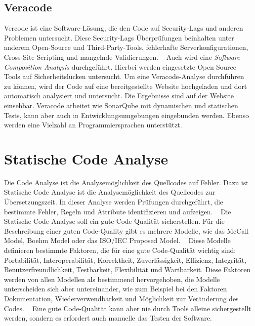 \subsection{Veracode}
Vercode ist eine Software-Lösung, die den Code auf Security-Lags und anderen Problemen untersucht. Diese Security-Lags Überprüfungen beinhalten unter anderem Open-Source und Third-Party-Tools, fehlerhafte Serverkonfigurationen, Cross-Site Scripting und mangelnde Validierungen. ~\parencite{veracodeSecurity}  Auch wird eine \textit{Software Composition Analysis} durchgeführt. Hierbei werden eingesetzte Open Source Tools auf Sicherheitslücken untersucht. Um eine Veracode-Analyse durchführen zu können, wird der Code auf eine bereitgestellte Website hochgeladen und dort automatisch analysiert und untersucht. Die Ergebnisse sind auf der Website einsehbar. Veracode arbeitet wie SonarQube mit dynamischen und statischen Tests, kann aber auch in Entwicklungsumgebungen eingebunden werden. Ebenso werden eine Vielzahl an Programmiersprachen unterstützt.  ~\parencite{veracodeDig}  

\section{Statische Code Analyse}
Die Code Analyse ist die Analysemöglichkeit des Quellcodes auf Fehler. Dazu ist Statische Code Analyse ist die Analysemöglichkeit des Quellcodes zur Übersetzungszeit. In dieser Analyse werden Prüfungen durchgeführt, die bestimmte Fehler, Regeln und Attribute identifizieren und aufzeigen. ~\parencite{gomes2009overview}
Die Statische Code Analyse soll ein gute Code-Qualität sicherstellen. Für die Beschreibung einer guten Code-Quality gibt es mehrere Modelle, wie das McCall Model, Boehm Model oder das ISO/IEC Proposed Model. ~\parencite{al2011software} Diese Modelle definieren bestimmte Faktoren, die für eine gute Code-Qualität wichtig sind: Portabilität, Interoperabilität, Korrektheit, Zuverlässigkeit, Effizienz, Integrität, Benutzerfreundlichkeit, Testbarkeit, Flexibilität und Wartbarkeit. \parencite{iqbalCodeQualityApproach} Diese Faktoren werden von allen Modellen als bestimmend hervorgehoben, die Modelle unterscheiden sich aber untereinander, wie zum Beispiel bei den Faktoren Dokumentation, Wiederverwendbarkeit und Möglichkeit zur Veränderung des Codes. ~\parencite{boukouchiModels}
Eine gute Code-Qualität kann aber nie durch Tools alleine sichergestellt werden, sondern es erfordert auch manuelle das Testen der Software. 
